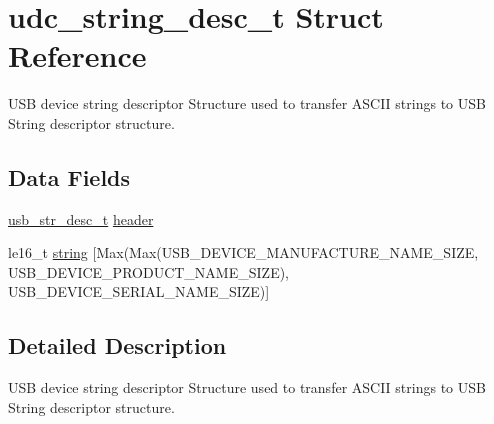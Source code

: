 \hypertarget{structudc__string__desc__t}{
\section{udc\-\_\-string\-\_\-desc\-\_\-t \-Struct \-Reference}
\label{structudc__string__desc__t}
}


\-U\-S\-B device string descriptor \-Structure used to transfer \-A\-S\-C\-I\-I strings to \-U\-S\-B \-String descriptor structure.  


\subsection*{\-Data \-Fields}
\begin{DoxyCompactItemize}
\item 
\hyperlink{structusb__str__desc__t}{usb\-\_\-str\-\_\-desc\-\_\-t} \hyperlink{structudc__string__desc__t_a2e3d32221a0a7ffb3edc623b2fab91e2}{header}
\item 
le16\-\_\-t \hyperlink{structudc__string__desc__t_afa37487318dd377251b7a7fe19f21837}{string} \mbox{[}\-Max(\-Max(\-U\-S\-B\-\_\-\-D\-E\-V\-I\-C\-E\-\_\-\-M\-A\-N\-U\-F\-A\-C\-T\-U\-R\-E\-\_\-\-N\-A\-M\-E\-\_\-\-S\-I\-Z\-E, \-U\-S\-B\-\_\-\-D\-E\-V\-I\-C\-E\-\_\-\-P\-R\-O\-D\-U\-C\-T\-\_\-\-N\-A\-M\-E\-\_\-\-S\-I\-Z\-E), \-U\-S\-B\-\_\-\-D\-E\-V\-I\-C\-E\-\_\-\-S\-E\-R\-I\-A\-L\-\_\-\-N\-A\-M\-E\-\_\-\-S\-I\-Z\-E)\mbox{]}
\end{DoxyCompactItemize}


\subsection{\-Detailed \-Description}
\-U\-S\-B device string descriptor \-Structure used to transfer \-A\-S\-C\-I\-I strings to \-U\-S\-B \-String descriptor structure. 

